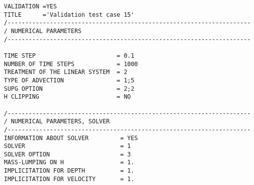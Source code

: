 \begin{lstlisting}[language=TelemacCas]
VALIDATION =YES
TITLE      ='Validation test case 15'
/---------------------------------------------------------------------
/ NUMERICAL PARAMETERS
/---------------------------------------------------------------------

TIME STEP                       = 0.1
NUMBER OF TIME STEPS            = 1000
TREATMENT OF THE LINEAR SYSTEM  = 2
TYPE OF ADVECTION               = 1;5
SUPG OPTION                     = 2;2
H CLIPPING                      = NO

/---------------------------------------------------------------------
/ NUMERICAL PARAMETERS, SOLVER
/---------------------------------------------------------------------
INFORMATION ABOUT SOLVER         = YES
SOLVER                           = 1
SOLVER OPTION                    = 3
MASS-LUMPING ON H                = 1.
IMPLICITATION FOR DEPTH          = 1.
IMPLICITATION FOR VELOCITY       = 1.
\end{lstlisting}



